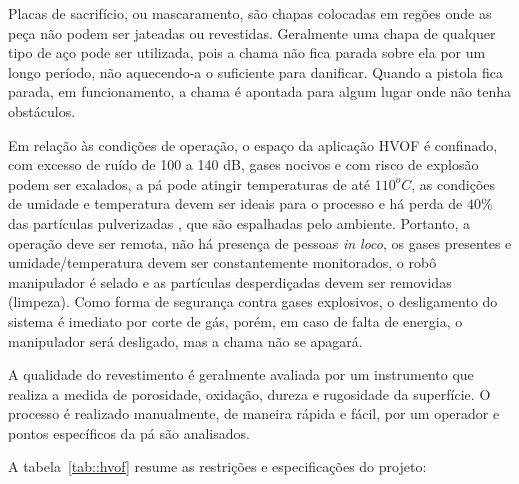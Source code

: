 Placas de sacrifício, ou mascaramento, são chapas colocadas em regões onde as
peça não podem ser jateadas ou revestidas. Geralmente uma chapa de qualquer tipo
de aço pode ser utilizada, pois a chama não fica parada sobre ela por um longo
período, não aquecendo-a o suficiente para danificar. Quando a pistola fica
parada, em funcionamento, a chama é apontada para algum lugar onde não tenha
obstáculos.

 

Em relação às condições de operação, o espaço da aplicação HVOF é confinado, com
excesso de ruído de 100 a 140 dB, gases nocivos e com risco de explosão podem
ser exalados, a pá pode atingir temperaturas de até $110^oC$, as condições de
umidade e temperatura devem ser ideais para o processo e há perda de $40\%$
das partículas pulverizadas  \citep{wu2006rebound}, que são espalhadas pelo
ambiente. Portanto, a operação deve ser remota, não há presença de pessoas \textit{in loco}, os gases
presentes e umidade/temperatura devem ser constantemente monitorados, o robô
manipulador é selado e as partículas desperdiçadas devem ser removidas
(limpeza). Como forma de segurança contra gases explosivos, o desligamento do
sistema é imediato por corte de gás, porém, em caso de falta de energia, o
manipulador será desligado, mas a chama não se apagará.

A qualidade do revestimento é geralmente avaliada por um instrumento que
realiza a medida de porosidade, oxidação, dureza e rugosidade da superfície. O
processo é realizado manualmente, de maneira rápida e fácil, por um operador e
pontos específicos da pá são analisados.

A tabela~\ref{tab::hvof} resume as restrições e especificações do
projeto:


